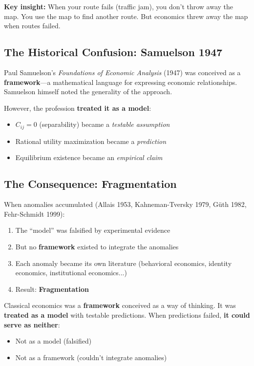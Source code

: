 \documentclass[12pt,a4paper]{article}
\begin{document}
\textbf{Key insight:} When your route fails (traffic jam), you don't throw away the map. You use the map to find another route. But economics threw away the map when routes failed.

\subsection{The Historical Confusion: Samuelson 1947}

Paul Samuelson's \emph{Foundations of Economic Analysis} (1947) was conceived as a \textbf{framework}---a mathematical language for expressing economic relationships. Samuelson himself noted the generality of the approach.

However, the profession \textbf{treated it as a model}:
\begin{itemize}[nosep]
\item $C_{ij} = 0$ (separability) became a \emph{testable assumption}
\item Rational utility maximization became a \emph{prediction}
\item Equilibrium existence became an \emph{empirical claim}
\end{itemize}

\subsection{The Consequence: Fragmentation}

When anomalies accumulated (Allais 1953, Kahneman-Tversky 1979, G\"{u}th 1982, Fehr-Schmidt 1999):
\begin{enumerate}[nosep]
\item The ``model'' was falsified by experimental evidence
\item But no \textbf{framework} existed to integrate the anomalies
\item Each anomaly became its own literature (behavioral economics, identity economics, institutional economics...)
\item Result: \textbf{Fragmentation}
\end{enumerate}

Classical economics was a \textbf{framework} conceived as a way of thinking. It was \textbf{treated as a model} with testable predictions. When predictions failed, \textbf{it could serve as neither}:
\begin{itemize}[nosep]
\item Not as a model (falsified)
\item Not as a framework (couldn't integrate anomalies)
\end{itemize}
\end{document}
